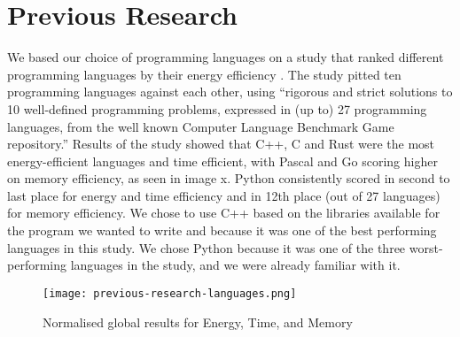 \chapter{Previous Research}
We based our choice of programming languages on a study that ranked different programming languages by their energy efficiency . The study pitted ten programming languages against each other, using “rigorous and strict solutions to 10 well-defined programming problems, expressed in (up to) 27 programming languages, from the well known Computer Language Benchmark Game repository.” \cite[abstract]{PEREIRA2021102609} Results of the study showed that C++, C and Rust were the most energy-efficient languages and time efficient, with Pascal and Go scoring higher on memory efficiency, as seen in image x. Python consistently scored in second to last place for energy and time efficiency and in 12th place (out of 27 languages) for memory efficiency.
We chose to use C++ based on the libraries available for the program we wanted to write and because it was one of the best performing languages in this study.
We chose Python because it was one of the three worst-performing languages in the study, and we were already familiar with it.

\begin{figure}[htbp]
	\centering
	\texttt{[image: previous-research-languages.png]}
	\caption{Normalised global results for Energy, Time, and Memory \cite[p.16]{PEREIRA2021102609}}
	\label{figure:previous-research-languages}
\end{figure}
